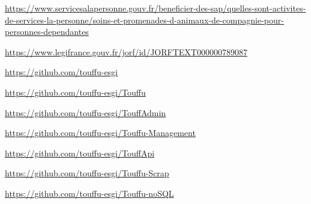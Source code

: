 \documentclass[conference]{IEEEtran}
\begin{document}
\begin{thebibliography}{00}

\url{https://www.servicesalapersonne.gouv.fr/beneficier-des-sap/quelles-sont-activites-de-services-la-personne/soins-et-promenades-d-animaux-de-compagnie-pour-personnes-dependantes}

\url{https://www.legifrance.gouv.fr/jorf/id/JORFTEXT000000789087
}

\url{https://github.com/touffu-esgi}

\url{https://github.com/touffu-esgi/Touffu}

\url{https://github.com/touffu-esgi/TouffAdmin}

\url{https://github.com/touffu-esgi/Touffu-Management}

\url{https://github.com/touffu-esgi/TouffApi}

\url{https://github.com/touffu-esgi/Touffu-Scrap}

\url{https://github.com/touffu-esgi/Touffu-noSQL}

\end{thebibliography}
\end{document}

